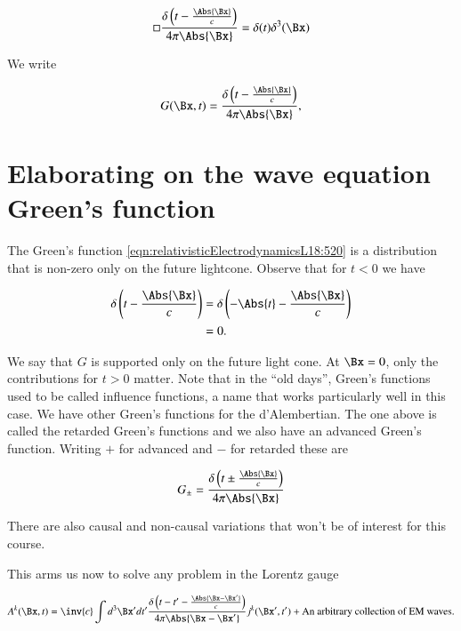 \begin{equation}\label{eqn:relativisticElectrodynamicsL18:480}
\square \frac{\delta\left(t - \frac{\Abs{\Bx}}{c}\right)}{4 \pi \Abs{\Bx} }
=
\delta(t) \delta^3(\Bx) 
\end{equation}

We write

\begin{equation}\label{eqn:relativisticElectrodynamicsL18:520}
G(\Bx, t) = \frac{\delta\left(t - \frac{\Abs{\Bx}}{c}\right)}{4 \pi \Abs{\Bx} },
\end{equation}

\section{Elaborating on the wave equation Green's function}

The Green's function \ref{eqn:relativisticElectrodynamicsL18:520} is a distribution that is non-zero only on the future lightcone.  Observe that for $t < 0$ we have

\begin{align*}
\delta\left(t - \frac{\Abs{\Bx}}{c}\right)
&=
\delta\left(-\Abs{t} - \frac{\Abs{\Bx}}{c}\right) \\
&= 0.
\end{align*}

We say that $G$ is supported only on the future light cone.  At $\Bx = 0$, only the contributions for $t > 0$ matter.  Note that in the ``old days'', Green's functions used to be called influence functions, a name that works particularly well in this case.  We have other Green's functions for the d'Alembertian.  The one above is called the retarded Green's functions and we also have an advanced Green's function.  Writing $+$ for advanced and $-$ for retarded these are

\begin{equation}\label{eqn:relativisticElectrodynamicsL18:600}
G_{\pm} = 
\frac{\delta\left(t \pm \frac{\Abs{\Bx}}{c}\right)}{4 \pi \Abs{\Bx}}
\end{equation}

There are also causal and non-causal variations that won't be of interest for this course.

This arms us now to solve any problem in the Lorentz gauge

\begin{equation}\label{eqn:relativisticElectrodynamicsL18:620}
A^k(\Bx, t) = \inv{c} \int d^3 \Bx' dt' 
\frac{\delta\left(t - t' - \frac{\Abs{\Bx -\Bx'}}{c}\right)}{4 \pi \Abs{\Bx - \Bx'}}
j^k(\Bx', t')
+\text{An arbitrary collection of EM waves.}
\end{equation}

